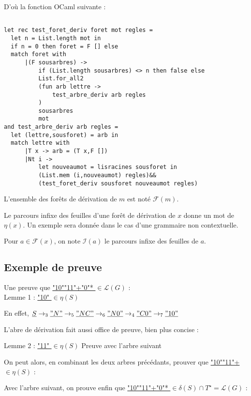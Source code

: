 \documentclass[a4paper,12pt]{article}
\begin{document}
D'où la fonction OCaml suivante :
{\color{DarkBlue}\begin{verbatim}

let rec test_foret_deriv foret mot regles =
  let n = List.length mot in
  if n = 0 then foret = F [] else
  match foret with
      |(F sousarbres) ->
          if (List.length sousarbres) <> n then false else
          List.for_all2
          (fun arb lettre ->
              test_arbre_deriv arb regles
          )
          sousarbres
          mot
and test_arbre_deriv arb regles =
  let (lettre,sousforet) = arb in
  match lettre with
      |T x -> arb = (T x,F [])
      |Nt i ->
          let nouveaumot = lisracines sousforet in
          (List.mem (i,nouveaumot) regles)&&
          (test_foret_deriv sousforet nouveaumot regles)
\end{verbatim}}


L'ensemble des forêts de dérivation de $m$ est noté $\mathcal{F}(m)$.

Le parcours infixe des feuilles d'une forêt de dérivation de $x$ donne un mot de $\eta(x)$.
Un exemple sera donnée dans le cas d'une grammaire non contextuelle.

Pour $a \in \mathcal{F}(x)$, on note $\mathcal{I}(a)$ le parcours infixe des feuilles de $a$. 

\subsection{Exemple de preuve}

Une preuve que \underline{ "10""11"+"0"* } $\in \mathcal{L}(G)$ :\\
Lemme 1 : \underline{ "10" } $\in \eta(S)$

    En effet, $\underline{ S }\rightarrow_3 \underline{ "N" } \rightarrow_5 \underline{ "NC" } \rightarrow_6 \underline{ "N0" } \rightarrow_4 \underline{ "C0" } \rightarrow_7 \underline{ "10" }$


L'abre de dérivation fait aussi office de preuve, bien plus concise :
   

Lemme 2 : \underline{ "11" } $\in \eta(S)$
Preuve avec l'arbre suivant
 

On peut alors, en combinant les deux arbres précédants, prouver que \underline{ "10""11"+ } $\in \eta(S)$ :
 

Avec l'arbre suivant, on prouve enfin que \underline{ "10""11"+"0"* } $\in \delta(S) \cap T^\star = \mathcal{L}(G)$ :
 
\end{document}
